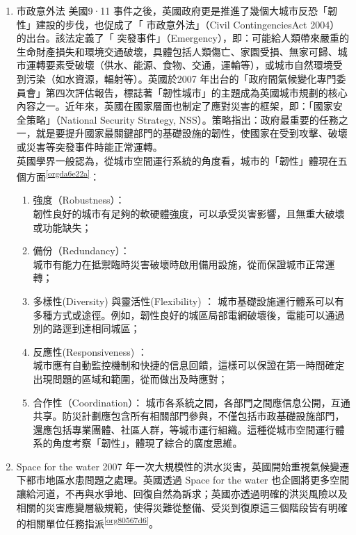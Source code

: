 \documentclass[a4paper,12pt]{article}
\begin{document}
\begin{enumerate}
\item 市政意外法
\label{sec:org394ad03}
美國9·11 事件之後，英國政府更是推進了幾個大城市反恐「韌性」建設的步伐，也促成了「 市政意外法」（Civil ContingenciesAct 2004） 的出台。該法定義了「 突發事件」（Emergency），即：可能給人類帶來嚴重的生命財產損失和環境交通破壞，具體包括人類傷亡、家園受損、無家可歸、城市運轉要素受破壞（供水、能源、食物、交通，運輸等），或城市自然環境受到污染（如水資源，輻射等）。英國於2007 年出台的「政府間氣候變化專門委員會」第四次評估報告，標誌著「韌性城市」的主題成為英國城市規劃的核心內容之一。近年來，英國在國家層面也制定了應對災害的框架，即：「國家安全策略」（National Security Strategy, NSS）。策略指出：政府最重要的任務之一，就是要提升國家最關鍵部門的基礎設施的韌性，使國家在受到攻擊、破壞或災害等突發事件時能正常運轉。\\

英國學界一般認為，從城市空間運行系統的角度看，城市的「韌性」體現在五個方面\textsuperscript{\ref{orgda6e22a}}：\\
\begin{enumerate}
\item 強度（Robustness）：\\
韌性良好的城市有足夠的軟硬體強度，可以承受災害影響，且無重大破壞或功能缺失；\\
\item 備份（Redundancy）：\\
城市有能力在抵禦臨時災害破壞時啟用備用設施，從而保證城市正常運轉；\\
\item 多樣性(Diversity) 與靈活性(Flexibility) ： 城市基礎設施運行體系可以有多種方式或途徑。例如，韌性良好的城區局部電網破壞後，電能可以通過別的路逕到達相同城區；\\
\item 反應性(Responsiveness) ：\\
城市應有自動監控機制和快捷的信息回饋，這樣可以保證在第一時間確定出現問題的區域和範圍，從而做出及時應對；\\
\item 合作性（Coordination）：   城市各系統之間，各部門之間應信息公開，互通共享。防災計劃應包含所有相關部門參與，不僅包括市政基礎設施部門，還應包括專業團體、社區人群，等城市運行組織。這種從城市空間運行體系的角度考察「韌性」，體現了綜合的廣度思維。\\
\end{enumerate}

\item Space for the water
\label{sec:orgda85ccc}
2007 年一次大規模性的洪水災害，英國開始重視氣候變遷下都市地區水患問題之處理。英國透過 Space for the water 也企圖將更多空間讓給河道，不再與水爭地、回復自然為訴求；英國亦透過明確的洪災風險以及相關的災害應變層級規範，使得災難從整備、受災到復原這三個階段皆有明確的相關單位任務指派\textsuperscript{\ref{org80567d6}}。\\
\end{enumerate}
\end{document}
